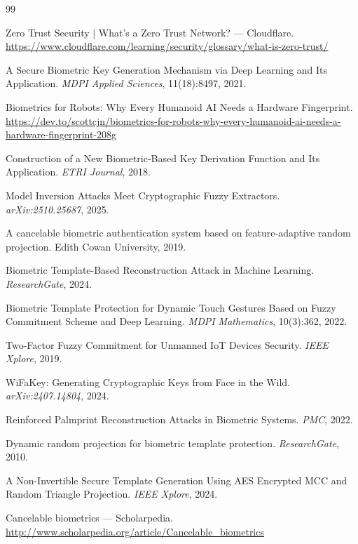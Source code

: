 \documentclass[11pt,twoside]{amsart}
\theoremstyle{plain}
\theoremstyle{definition}
\theoremstyle{remark}
\begin{document}
\begin{thebibliography}{99}

Zero Trust Security | What's a Zero Trust Network? --- Cloudflare.
\url{https://www.cloudflare.com/learning/security/glossary/what-is-zero-trust/}

A Secure Biometric Key Generation Mechanism via Deep Learning and Its Application.
\textit{MDPI Applied Sciences}, 11(18):8497, 2021.

Biometrics for Robots: Why Every Humanoid AI Needs a Hardware Fingerprint.
\url{https://dev.to/scottcjn/biometrics-for-robots-why-every-humanoid-ai-needs-a-hardware-fingerprint-208g}

Construction of a New Biometric-Based Key Derivation Function and Its Application.
\textit{ETRI Journal}, 2018.

Model Inversion Attacks Meet Cryptographic Fuzzy Extractors.
\textit{arXiv:2510.25687}, 2025.

A cancelable biometric authentication system based on feature-adaptive random projection.
Edith Cowan University, 2019.

Biometric Template-Based Reconstruction Attack in Machine Learning.
\textit{ResearchGate}, 2024.

Biometric Template Protection for Dynamic Touch Gestures Based on Fuzzy Commitment Scheme and Deep Learning.
\textit{MDPI Mathematics}, 10(3):362, 2022.

Two-Factor Fuzzy Commitment for Unmanned IoT Devices Security.
\textit{IEEE Xplore}, 2019.

WiFaKey: Generating Cryptographic Keys from Face in the Wild.
\textit{arXiv:2407.14804}, 2024.

Reinforced Palmprint Reconstruction Attacks in Biometric Systems.
\textit{PMC}, 2022.

Dynamic random projection for biometric template protection.
\textit{ResearchGate}, 2010.

A Non-Invertible Secure Template Generation Using AES Encrypted MCC and Random Triangle Projection.
\textit{IEEE Xplore}, 2024.

Cancelable biometrics --- Scholarpedia.
\url{http://www.scholarpedia.org/article/Cancelable_biometrics}


\end{thebibliography}
\end{document}
